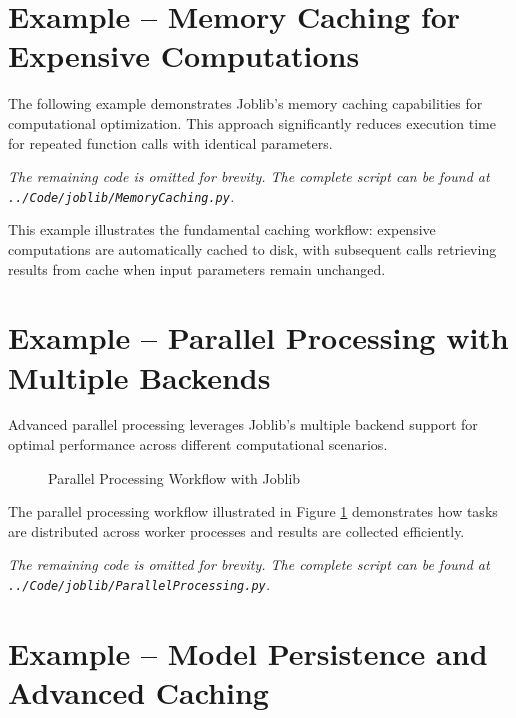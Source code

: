 \section{Example -- Memory Caching for Expensive Computations}
\label{sec:memory_example}

The following example demonstrates Joblib's memory caching capabilities for computational optimization. This approach significantly reduces execution time for repeated function calls with identical parameters.


\noindent\textit{The remaining code is omitted for brevity. The complete script can be found at \texttt{../Code/joblib/MemoryCaching.py}.}

This example illustrates the fundamental caching workflow: expensive computations are automatically cached to disk, with subsequent calls retrieving results from cache when input parameters remain unchanged.

\section{Example -- Parallel Processing with Multiple Backends}
\label{sec:parallel_example}

Advanced parallel processing leverages Joblib's multiple backend support for optimal performance across different computational scenarios.

\begin{figure}[htbp]
	\centering
    
	\caption{Parallel Processing Workflow with Joblib}
	\label{fig:parallel_flow}
\end{figure}

The parallel processing workflow illustrated in Figure \ref{fig:parallel_flow} demonstrates how tasks are distributed across worker processes and results are collected efficiently.


\noindent\textit{The remaining code is omitted for brevity. The complete script can be found at \texttt{../Code/joblib/ParallelProcessing.py}.}

\section{Example -- Model Persistence and Advanced Caching}
\label{sec:persistence_example}

